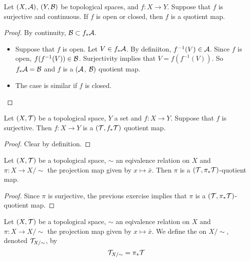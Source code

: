 \documentclass{book}
\begin{document}
	\begin{ex} 
	Let $(X, \mathcal{A})$, $(Y, \mathcal{B})$ be topological spaces, and $f:X \rightarrow Y$. Suppose that $f$ is surjective and continuous. If $f$ is open or closed, then $f$ is a quotient map.
	\end{ex}
	
	\begin{proof}
	By continuity, $\mathcal{B} \subset f_*\mathcal{A}$. 
	\begin{itemize}
	\item Suppose that $f$ is open. Let $V \in f_*\mathcal{A}$. By definiiton, $f^{-1}(V) \in \mathcal{A}$. Since $f$ is open, $f(f^{-1}(V)) \in \mathcal{B}$. Surjectivity implies that $V = f(f^{-1}(V))$. So $f_*\mathcal{A} = \mathcal{B}$ and $f$ is a $(\mathcal{A}$, $\mathcal{B})$ quotient map.
	\item The case is similar if $f$ is closed.
	\end{itemize}
	\end{proof}
	
	\begin{ex} 
	Let $(X, \mathcal{T})$ be a topological space, $Y$ a set and $f:X \rightarrow Y$. Suppose that $f$ is surjective. Then $f: X \rightarrow Y$ is a $(\mathcal{T}, f_*\mathcal{T})$ quotient map. 
	\end{ex}
	
	\begin{proof}
	Clear by definition.
	\end{proof}
	
	
	\begin{ex} 
	Let $(X, \mathcal{T})$ be a topological space, $\sim$ an eqivalence relation on $X$ and $\pi:X \rightarrow X/\sim$ the projection map given by $x \mapsto \bar{x}$. Then $\pi$ is a $(\mathcal{T}, \pi_*\mathcal{T})$-quotient map. 
	\end{ex}
	
	\begin{proof}
	Since $\pi$ is surjective, the previous exercise implies that $\pi$ is a $(\mathcal{T}, \pi_*\mathcal{T})$-quotient map. 
	\end{proof}

	\begin{defn} 
		Let $(X, \mathcal{T})$ be a topological space, $\sim$ an eqivalence relation on $X$ and $\pi:X \rightarrow X/\sim$ the projection map given by $x \mapsto \bar{x}$. We define the  on $X/ \sim$, denoted $\mathcal{T}_{X/ \sim}$, by $$\mathcal{T}_{X/ \sim} = \pi_{*}\mathcal{T}$$
	\end{defn}
\end{document}

